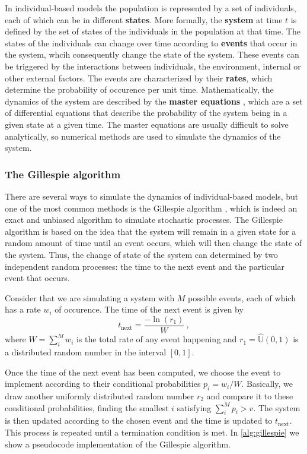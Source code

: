 In individual-based models the population is represented by a set of
individuals, each of which can be in different \textbf{states}. More formally,
the \textbf{system} at time $t$ is defined by the set of states of the
individuals in the population at that time. The states of the individuals can
change over time according to \textbf{events} that occur in the system, whcih
consequently change the state of the system. These events can be triggered by
the interactions between individuals, the environment, internal or other
external factors. The events are characterized by their \textbf{rates}, which
determine the probability of occurence per unit time. Mathematically, the
dynamics of the system are described by the \textbf{master equations}
\cite{Toral_master_eqs}, which are a set of differential equations that
describe the probability of the system being in a given state at a given time.
The master equations are usually difficult to solve analytically, so numerical
methods are used to simulate the dynamics of the system.

\subsubsection*{The Gillespie algorithm}

There are several ways to simulate the dynamics of individual-based models, but
one of the most common methods is the Gillespie algorithm \cite{Gillespie1977},
which is indeed an exact and unbiased algorithm to simulate stochastic
processes. The Gillespie algorithm is based on the idea that the system will
remain in a given state for a random amount of time until an event occurs,
which will then change the state of the system. Thus, the change of state of
the system can determined by two independent random processes: the time to the
next event and the particular event that occurs.

Consider that we are simulating a system with $M$ possible events, each of
which has a rate $w_i$ of occurence. The time of the next event is given by
\begin{equation}
  t_{\textrm{next}}=\frac{-\ln(r_1)}{W} \ ,
\end{equation}
where $W=\sum_i^M w_i$ is the total rate of any event happening and
$r_1=\hat{\mathbb{U}}(0,1)$ is a distributed random number in the interval
$[0,1]$.

Once the time of the next event has been computed, we choose the event to
implement according to their conditional probabilities $p_i=w_i/W$. Basically,
we draw another uniformly distributed random number $r_2$ and compare it to
these conditional probabilities, finding the smallest $i$ satisfying
$\sum_i^Mp_i>v$. The system is then updated according to the chosen event and
the time is updated to $t_{\textrm{next}}$. This process is repeated until a
termination condition is met. In \cref{alg:gillespie} we show a pseudocode
implementation of the Gillespie algorithm.

